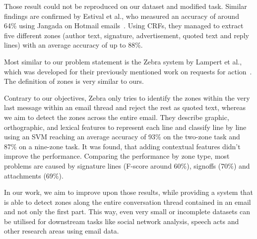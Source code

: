 \documentclass{llncs}
\begin{document}
Those result could not be reproduced on our dataset and modified task.
Similar findings are confirmed by Estival et al., who measured an accuracy of around 64\% using Jangada on Hotmail emails~\cite{profiling}.
Using CRFs, they managed to extract five different zones (author text, signature, advertisement, quoted text and reply lines) with an average accuracy of up to 88\%.

Most similar to our problem statement is the Zebra system by Lampert et al., which was developed for their previously mentioned work on requests for action~\cite{zones,rfa}.
The definition of zones is very similar to ours.

Contrary to our objectives, Zebra only tries to identify the zones within the very last message within an email thread and reject the rest as quoted text, whereas we aim to detect the zones across the entire email.
They describe graphic, orthographic, and lexical features to represent each line and classify line by line using an SVM reaching an average accuracy of 93\% on the two-zone task and 87\% on a nine-zone task.
It was found, that adding contextual features didn't improve the performance.
Comparing the performance by zone type, most problems are caused by signature lines (F-score around 60\%), signoffs (70\%) and attachments (69\%).

In our work, we aim to improve upon those results, while providing a system that is able to detect zones along the entire conversation thread contained in an email and not only the first part.
This way, even very small or incomplete datasets can be utilised for downstream tasks like social network analysis, speech acts and other research areas using email data.





\end{document}
